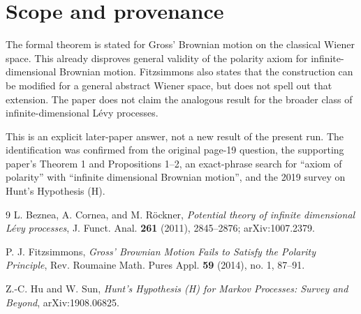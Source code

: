 \documentclass[11pt]{article}
\begin{document}
\section*{Scope and provenance}

The formal theorem is stated for Gross' Brownian motion on the classical
Wiener space. This already disproves general validity of the polarity axiom
for infinite-dimensional Brownian motion. Fitzsimmons also states that the
construction can be modified for a general abstract Wiener space, but does
not spell out that extension. The paper does not claim the analogous result
for the broader class of infinite-dimensional L\'evy processes.

This is an explicit later-paper answer, not a new result of the present run.
The identification was confirmed from the original page-19 question, the
supporting paper's Theorem 1 and Propositions 1--2, an exact-phrase search for
``axiom of polarity'' with ``infinite dimensional Brownian motion'', and the
2019 survey on Hunt's Hypothesis (H).

\begin{thebibliography}{9}
L. Beznea, A. Cornea, and M. R\"ockner,
\emph{Potential theory of infinite dimensional L\'evy processes},
J. Funct. Anal. \textbf{261} (2011), 2845--2876;
arXiv:1007.2379.

P. J. Fitzsimmons,
\emph{Gross' Brownian Motion Fails to Satisfy the Polarity Principle},
Rev. Roumaine Math. Pures Appl. \textbf{59} (2014), no. 1, 87--91.

Z.-C. Hu and W. Sun,
\emph{Hunt's Hypothesis (H) for Markov Processes: Survey and Beyond},
arXiv:1908.06825.
\end{thebibliography}
\end{document}
